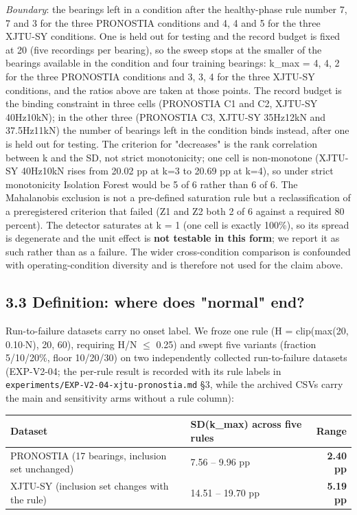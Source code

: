 \documentclass[11pt]{article}
\newcommand{\code}[1]{\texttt{#1}}
\begin{document}
\emph{Boundary}: the bearings left in a condition after the healthy-phase rule number 7, 7 and 3 for the three PRONOSTIA conditions and 4, 4 and 5 for the three XJTU-SY conditions. One is held out for testing and the record budget is fixed at 20 (five recordings per bearing), so the sweep stops at the smaller of the bearings available in the condition and four training bearings: k\_max = 4, 4, 2 for the three PRONOSTIA conditions and 3, 3, 4 for the three XJTU-SY conditions, and the ratios above are taken at those points. The record budget is the binding constraint in three cells (PRONOSTIA C1 and C2, XJTU-SY 40Hz10kN); in the other three (PRONOSTIA C3, XJTU-SY 35Hz12kN and 37.5Hz11kN) the number of bearings left in the condition binds instead, after one is held out for testing. The criterion for "decreases" is the rank correlation between k and the SD, not strict monotonicity; one cell is non-monotone (XJTU-SY 40Hz10kN rises from 20.02 pp at k=3 to 20.69 pp at k=4), so under strict monotonicity Isolation Forest would be 5 of 6 rather than 6 of 6. The Mahalanobis exclusion is not a pre-defined saturation rule but a reclassification of a preregistered criterion that failed (Z1 and Z2 both 2 of 6 against a required 80 percent). The detector saturates at k = 1 (one cell is exactly 100\%), so its spread is degenerate and the unit effect is \textbf{not testable in this form}; we report it as such rather than as a failure. The wider cross-condition comparison is confounded with operating-condition diversity and is therefore not used for the claim above.

\subsection{3.3 Definition: where does "normal" end?}

Run-to-failure datasets carry no onset label. We froze one rule (H = clip(max(20, 0.10$\cdot$N), 20, 60), requiring H/N $\le$ 0.25) and swept five variants (fraction 5/10/20\%, floor 10/20/30) on two independently collected run-to-failure datasets (EXP-V2-04; the per-rule result is recorded with its rule labels in \code{experiments/EXP-V2-04-xjtu-pronostia.md} \S3, while the archived CSVs carry the main and sensitivity arms without a rule column):

\begin{table}[t]
\centering
\small
\begin{tabular}{llr}
\toprule
Dataset & SD(k\_max) across five rules & Range \\
\midrule
PRONOSTIA (17 bearings, inclusion set unchanged) & 7.56 -- 9.96 pp & \textbf{2.40 pp} \\
XJTU-SY (inclusion set changes with the rule) & 14.51 -- 19.70 pp & \textbf{5.19 pp} \\
\bottomrule
\end{tabular}
\end{table}
\end{document}
